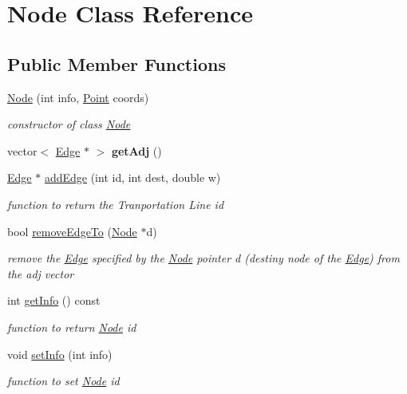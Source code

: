 \hypertarget{class_node}{}\section{Node Class Reference}
\label{class_node}
\subsection*{Public Member Functions}
\begin{DoxyCompactItemize}
\item 
\hyperlink{class_node_a81f886219d100c03c66848653c0da654}{Node} (int info, \hyperlink{struct_point}{Point} coords)
\begin{DoxyCompactList}\small\item\em constructor of class \hyperlink{class_node}{Node} \end{DoxyCompactList}\item 
\mbox{\label{class_node_a02afa9074591a30d2cdb42124686bbf6}} 
vector$<$ \hyperlink{class_edge}{Edge} $\ast$ $>$ {\bfseries get\+Adj} ()
\item 
\hyperlink{class_edge}{Edge} $\ast$ \hyperlink{class_node_ac5ca4fd7895f44cf374791717cd239e5}{add\+Edge} (int id, int dest, double w)
\begin{DoxyCompactList}\small\item\em function to return the Tranportation Line id \end{DoxyCompactList}\item 
bool \hyperlink{class_node_a9ff3a1149a7e9c427fdba4068c11a42b}{remove\+Edge\+To} (\hyperlink{class_node}{Node} $\ast$d)
\begin{DoxyCompactList}\small\item\em remove the \hyperlink{class_edge}{Edge} specified by the \hyperlink{class_node}{Node} pointer d (destiny node of the \hyperlink{class_edge}{Edge}) from the adj vector \end{DoxyCompactList}\item 
int \hyperlink{class_node_a07008db4cafcc0f3df7746992d22bbd3}{get\+Info} () const
\begin{DoxyCompactList}\small\item\em function to return \hyperlink{class_node}{Node} id \end{DoxyCompactList}\item 
void \hyperlink{class_node_a877cee0d253352080b00c2441f271dde}{set\+Info} (int info)
\begin{DoxyCompactList}\small\item\em function to set \hyperlink{class_node}{Node} id \end{DoxyCompactList}\item 

\end{DoxyCompactItemize}
